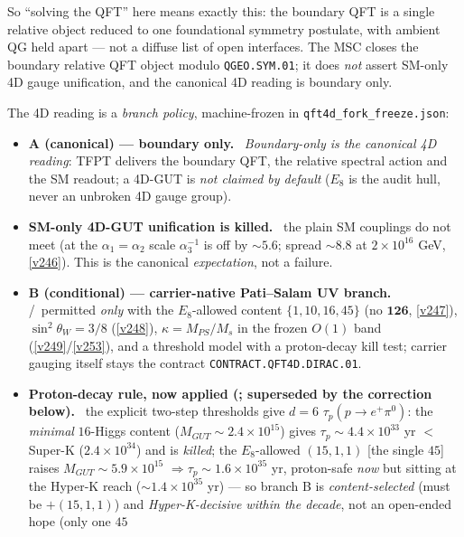 So ``solving the QFT'' here means exactly this: the boundary QFT is a single relative object reduced to
one foundational symmetry postulate, with ambient QG held apart --- not a diffuse list of open interfaces.
The MSC closes the boundary relative QFT object modulo \texttt{QGEO.SYM.01}; it does \emph{not} assert
SM-only 4D gauge unification, and the canonical 4D reading is boundary only.
\begin{keybox}
The 4D reading is a \emph{branch policy}, machine-frozen in \texttt{qft4d\_fork\_freeze.json}:
\begin{itemize}\setlength\itemsep{1pt}
\item \textbf{A (canonical) --- boundary only.} \mC\ \emph{Boundary-only is the canonical 4D reading}:
  TFPT delivers the boundary QFT, the relative spectral action and the SM readout; a 4D-GUT is
  \emph{not claimed by default} ($E_8$ is the audit hull, never an unbroken 4D gauge group).
\item \textbf{SM-only 4D-GUT unification is killed.} \mX\ the plain SM couplings do not meet (at the
  $\alpha_1{=}\alpha_2$ scale $\alpha_3^{-1}$ is off by ${\sim}5.6$; spread ${\sim}8.8$ at $2{\times}10^{16}$
  GeV, \vref{v246}). This is the canonical \emph{expectation}, not a failure.
\item \textbf{B (conditional) --- carrier-native Pati--Salam UV branch.} \mC/\mO\ permitted \emph{only}
  with the $E_8$-allowed content $\{1,10,16,45\}$ (no $\mathbf{126}$, \vref{v247}), $\sin^2\theta_W{=}3/8$
  (\vref{v248}), $\kappa{=}M_{PS}/M_s$ in the frozen $O(1)$ band (\vref{v249}/\vref{v253}), and a threshold
  model with a proton-decay kill test; carrier gauging itself stays the contract \texttt{CONTRACT.QFT4D.DIRAC.01}.
\item \textbf{Proton-decay rule, now applied (; superseded by the
  correction below).} \mX\ the explicit
  two-step thresholds give $d{=}6$ $\tau_p(p{\to}e^+\pi^0)$: the \emph{minimal} $16$-Higgs content
  ($M_{GUT}{\sim}2.4{\times}10^{15}$) gives $\tau_p{\sim}4.4{\times}10^{33}$ yr $<$ Super-K
  ($2.4{\times}10^{34}$) and is \emph{killed}; the $E_8$-allowed $(15,1,1)$ [the single $45$] raises
  $M_{GUT}{\sim}5.9{\times}10^{15}$ $\Rightarrow\tau_p{\sim}1.6{\times}10^{35}$ yr, proton-safe \emph{now}
  but sitting at the Hyper-K reach (${\sim}1.4{\times}10^{35}$ yr) --- so branch B is \emph{content-selected}
  (must be $+(15,1,1)$) and \emph{Hyper-K-decisive within the decade}, not an open-ended hope (only one $45$

\end{itemize}
\end{keybox}

